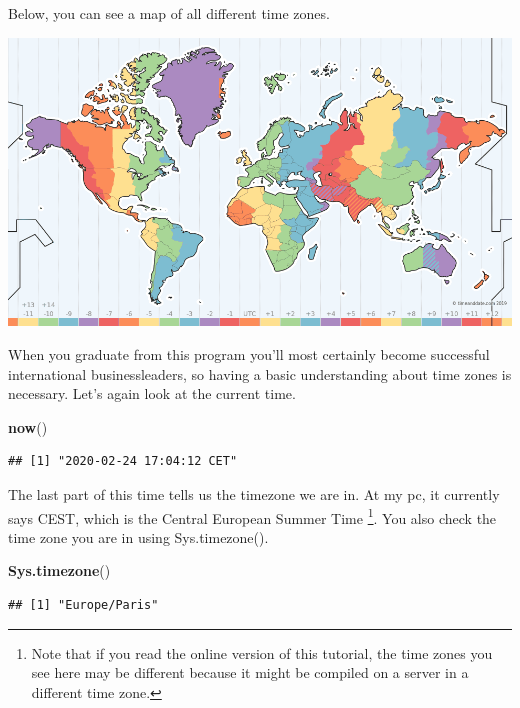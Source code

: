 \documentclass[]{tufte-book}
\newenvironment{Shaded}{}{}
\newcommand{\KeywordTok}[1]{\textcolor[rgb]{0.00,0.44,0.13}{\textbf{#1}}}
\newcommand{\NormalTok}[1]{#1}
\begin{document}
Below, you can see a map of all different time zones.

\begin{center}\includegraphics[width=1\linewidth]{images/timezones} \end{center}

When you graduate from this program you'll most certainly become successful international businessleaders, so having a basic understanding about time zones is necessary. Let's again look at the current time.

\begin{Shaded}
\begin{Highlighting}[]
\KeywordTok{now}\NormalTok{()}
\end{Highlighting}
\end{Shaded}

\begin{verbatim}
## [1] "2020-02-24 17:04:12 CET"
\end{verbatim}

The last part of this time tells us the timezone we are in. At my pc, it currently says CEST, which is the Central European Summer Time \footnote{Note that if you read the online version of this tutorial, the time zones you see here may be different because it might be compiled on a server in a different time zone.}. You also check the time zone you are in using Sys.timezone().

\begin{Shaded}
\begin{Highlighting}[]
\KeywordTok{Sys.timezone}\NormalTok{()}
\end{Highlighting}
\end{Shaded}

\begin{verbatim}
## [1] "Europe/Paris"
\end{verbatim}
\end{document}
